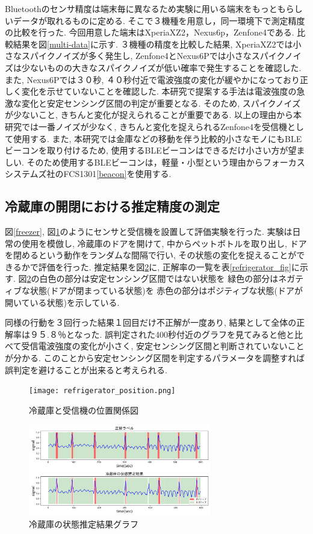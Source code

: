\documentclass[Japanese]{dicomopapers}
\begin{document}
Bluetoothのセンサ精度は端末毎に異なるため実験に用いる端末をもっともらしいデータが取れるものに定める.
そこで３機種を用意し，同一環境下で測定精度の比較を行った.
今回用意した端末はXperiaXZ2，Nexus6p，Zenfone4である.
比較結果を図\ref{multi-data}に示す.
３機種の精度を比較した結果, XperiaXZ2では小さなスパイクノイズが多く発生し, Zenfone4とNexus6Pでは小さなスパイクノイズは少ないものの大きなスパイクノイズが低い確率で発生することを確認した.
また, Nexus6Pでは３０秒, ４０秒付近で電波強度の変化が緩やかになっており正しく変化を示せていないことを確認した.
本研究で提案する手法は電波強度の急激な変化と安定センシング区間の判定が重要となる.
そのため, スパイクノイズが少ないこと, きちんと変化が捉えられることが重要である.
以上の理由から本研究では一番ノイズが少なく, きちんと変化を捉えられるZenfone4を受信機として使用する.
また, 本研究では金庫などの移動を伴う比較的小さなモノにもBLEビーコンを取り付けるため, 使用するBLEビーコンはできるだけ小さい方が望ましい.
そのため使用するBLEビーコンは，軽量・小型という理由からフォーカスシステムズ社のFCS1301\ref{beacon}を使用する.


\subsection{冷蔵庫の開閉における推定精度の測定}
図\ref{freezer}, 図\ref{refrigerator_position}のようにセンサと受信機を設置して評価実験を行った.
実験は日常の使用を模倣し, 冷蔵庫のドアを開けて, 中からペットボトルを取り出し, ドアを閉めるという動作をランダムな間隔で行い, その状態の変化を捉えることができるかで評価を行った.
推定結果を図\ref{refrigerator_graph}に, 正解率の一覧を表\ref{refrigerator_fig}に示す.
図\ref{refrigerator_graph}の白色の部分は安定センシング区間ではない状態を 緑色の部分はネガティブな状態(ドアが閉まっている状態)を 赤色の部分はポジティブな状態(ドアが開いている状態)を示している.

同様の行動を３回行った結果１回目だけ不正解が一度あり, 結果として全体の正解率は９５.８％となった.
誤判定された400秒付近のグラフを見てみると他と比べて受信電波強度の変化が小さく, 安定センシング区間と判断されていないことが分かる.
このことから安定センシング区間を判定するパラメータを調整すれば誤判定を避けることが出来ると考えられる.

\begin{figure}[ht]
    \centering
    \texttt{[image: refrigerator\_position.png]}
    \caption{冷蔵庫と受信機の位置関係図}
    \label{refrigerator_position}
\end{figure}

\begin{figure}[ht]
    \centering
    \includegraphics[width=8cm]{refrigerator_graph.png}
    \caption{冷蔵庫の状態推定結果グラフ}
    \label{refrigerator_graph}
\end{figure}
\end{document}
